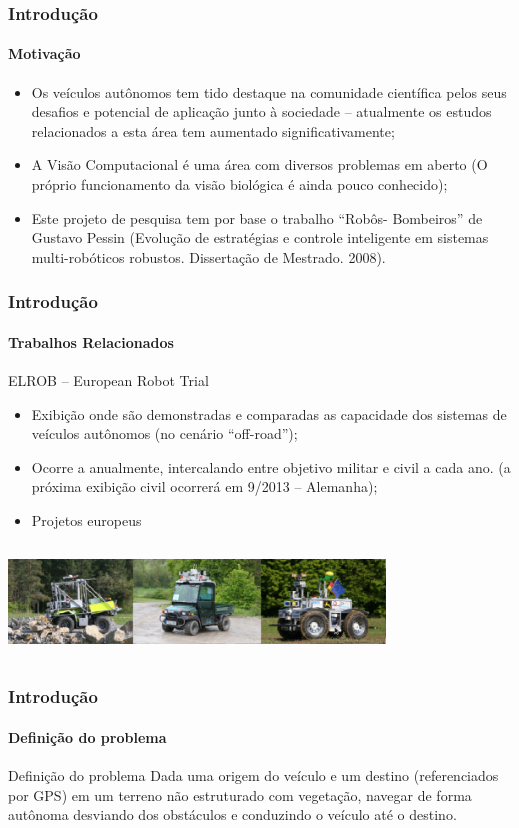 \documentclass[brazil]{beamer}
\begin{document}
\begin{frame}
\frametitle{Introdução}
\framesubtitle{Motivação}
\begin{itemize}
  \item Os veículos autônomos tem tido destaque na comunidade
científica pelos seus desafios e potencial de aplicação junto à
sociedade – atualmente os estudos relacionados a esta área
tem aumentado significativamente;
  \item A Visão Computacional é uma área com diversos problemas
em aberto (O próprio funcionamento da visão biológica é
ainda pouco conhecido);
  \item Este projeto de pesquisa tem por base o trabalho “Robôs-
Bombeiros” de Gustavo Pessin (Evolução de estratégias e controle
inteligente em sistemas multi-robóticos robustos. Dissertação de
Mestrado. 2008).
\end{itemize}
\end{frame}

\begin{frame}
\frametitle{Introdução}
\framesubtitle{Trabalhos Relacionados}
ELROB – European Robot Trial
\begin{itemize}
  \item Exibição onde são demonstradas e comparadas as capacidade dos sistemas de
veículos autônomos (no cenário “off-road”);
  \item Ocorre a anualmente, intercalando entre objetivo militar e civil a cada
ano. (a próxima exibição civil ocorrerá em 9/2013 – Alemanha);
  \item Projetos europeus
\end{itemize}
\includegraphics[width=10cm,height=3cm,]{../img/elrob.png}
\end{frame}


\begin{frame}
\frametitle{Introdução}
\framesubtitle{Definição do problema}
\begin{block}{Definição do problema}
Dada uma origem do veículo e um destino (referenciados por GPS) em um terreno
não estruturado com vegetação, navegar de forma autônoma desviando dos
obstáculos e conduzindo o veículo até o destino. 
\end{block}
\end{frame}
\end{document}
